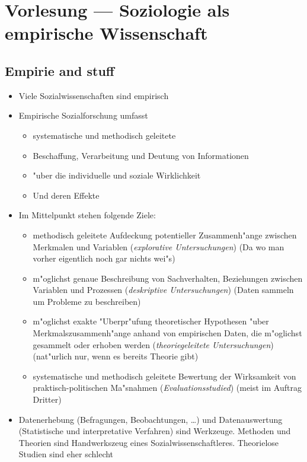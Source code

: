 \section{Vorlesung  --- Soziologie als empirische Wissenschaft}

\subsection{Empirie and stuff}
\begin{itemize}
	\item
		Viele Sozialwissenschaften sind empirisch
	\item
		Empirische Sozialforschung umfasst
		\begin{itemize}
			\item
				systematische und methodisch geleitete
			\item
				Beschaffung, Verarbeitung und Deutung von Informationen
			\item
				"uber die individuelle und soziale Wirklichkeit
			\item
				Und deren Effekte
		\end{itemize}
	\item
		Im Mittelpunkt stehen folgende Ziele:
		\begin{itemize}
			\item
				methodisch geleitete Aufdeckung potentieller Zusammenh"ange zwischen Merkmalen und Variablen (\textit{explorative Untersuchungen}) (Da wo man vorher eigentlich noch gar nichts wei"s)
			\item
				m"oglichst genaue Beschreibung von Sachverhalten, Beziehungen zwischen Variablen und Prozessen (\textit{deskriptive Untersuchungen}) (Daten sammeln um Probleme zu beschreiben)
			\item
				m"oglichst exakte "Uberpr"ufung theoretischer Hypothesen "uber Merkmalszusammenh"ange anhand von empirischen Daten, die m"oglichst gesammelt oder erhoben werden (\textit{theoriegeleitete Untersuchungen}) (nat"urlich nur, wenn es bereits Theorie gibt)
			\item
				systematische und methodisch geleitete Bewertung der Wirksamkeit von praktisch-politischen Ma"snahmen (\textit{Evaluationsstudied}) (meist im Auftrag Dritter)
		\end{itemize}
	\item
		Datenerhebung (Befragungen, Beobachtungen, \dots) und  Datenauswertung (Statistische und interpretative Verfahren) sind Werkzeuge. Methoden und Theorien sind Handwerkszeug eines Sozialwissenschaftleres. Theorielose Studien sind eher schlecht
\end{itemize}

